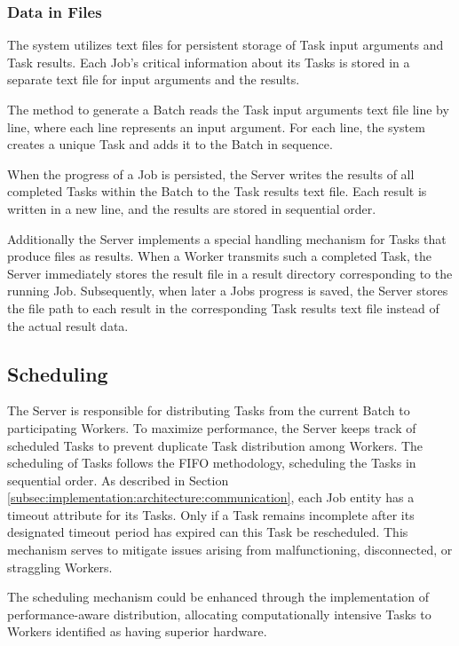 \subsubsection{Data in Files}
The system utilizes text files for persistent storage of Task input arguments and Task results. Each Job's critical information about its Tasks is stored in a separate text file for input arguments and the results. 

The method to generate a Batch reads the Task input arguments text file line by line, where each line represents an input argument. For each line, the system creates a unique Task and adds it to the Batch in sequence.

When the progress of a Job is persisted, the Server writes the results of all completed Tasks within the Batch to the Task results text file. Each result is written in a new line, and the results are stored in sequential order.

Additionally the Server implements a special handling mechanism for Tasks that produce files as results. When a Worker transmits such a completed Task, the Server immediately stores the result file in a result directory corresponding to the running Job. Subsequently, when later a Jobs progress is saved, the Server stores the file path to each result in the corresponding Task results text file instead of the actual result data.

\subsection{Scheduling}
\label{subsec:implementation:architecture:scheduling}
The Server is responsible for distributing Tasks from the current Batch to participating Workers. To maximize performance, the Server keeps track of scheduled Tasks to prevent duplicate Task distribution among Workers. The scheduling of Tasks follows the \ac{FIFO} methodology, scheduling the Tasks in sequential order. As described in Section \ref{subsec:implementation:architecture:communication}, each Job entity has a timeout attribute for its Tasks. Only if a Task remains incomplete after its designated timeout period has expired can this Task be rescheduled. This mechanism serves to mitigate issues arising from malfunctioning, disconnected, or straggling Workers.

The scheduling mechanism could be enhanced through the implementation of performance-aware distribution, allocating computationally intensive Tasks to Workers identified as having superior hardware.

